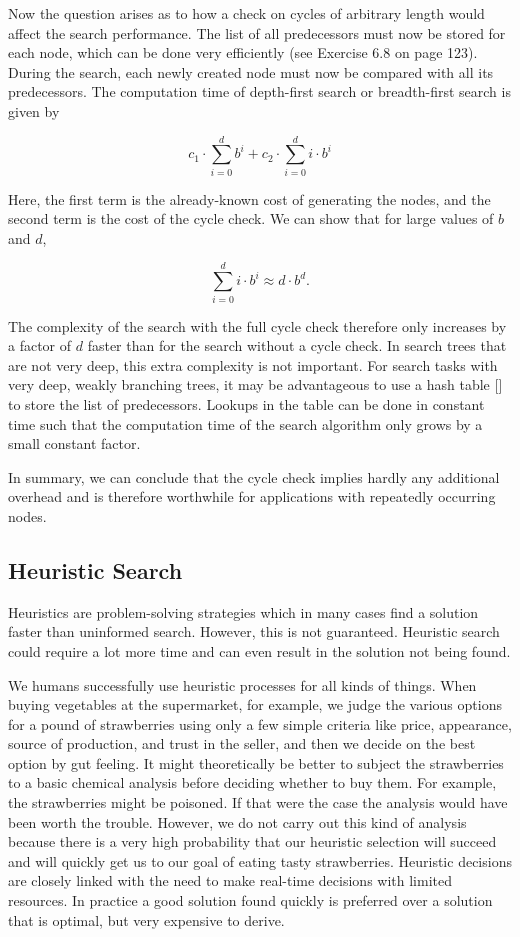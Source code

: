 \documentclass[10pt]{book}
\begin{document}
Now the question arises as to how a check on cycles of arbitrary length would affect the search performance. The list of all predecessors must now be stored for each node, which can be done very efficiently (see Exercise 6.8 on page 123). During the search, each newly created node must now be compared with all its predecessors. The computation time of depth-first search or breadth-first search is given by

$$
c_{1} \cdot \sum_{i=0}^{d} b^{i}+c_{2} \cdot \sum_{i=0}^{d} i \cdot b^{i}
$$

Here, the first term is the already-known cost of generating the nodes, and the second term is the cost of the cycle check. We can show that for large values of $b$ and $d$,

$$
\sum_{i=0}^{d} i \cdot b^{i} \approx d \cdot b^{d} .
$$

The complexity of the search with the full cycle check therefore only increases by a factor of $d$ faster than for the search without a cycle check. In search trees that are not very deep, this extra complexity is not important. For search tasks with very deep, weakly branching trees, it may be advantageous to use a hash table [\cite{clr90}] to store the list of predecessors. Lookups in the table can be done in constant time such that the computation time of the search algorithm only grows by a small constant factor.

In summary, we can conclude that the cycle check implies hardly any additional overhead and is therefore worthwhile for applications with repeatedly occurring nodes.

\subsection{Heuristic Search}
Heuristics are problem-solving strategies which in many cases find a solution faster than uninformed search. However, this is not guaranteed. Heuristic search could require a lot more time and can even result in the solution not being found.

We humans successfully use heuristic processes for all kinds of things. When buying vegetables at the supermarket, for example, we judge the various options for a pound of strawberries using only a few simple criteria like price, appearance, source of production, and trust in the seller, and then we decide on the best option by gut feeling. It might theoretically be better to subject the strawberries to a basic chemical analysis before deciding whether to buy them. For example, the strawberries might be poisoned. If that were the case the analysis would have been worth the trouble. However, we do not carry out this kind of analysis because there is a very high probability that our heuristic selection will succeed and will quickly get us to our goal of eating tasty strawberries.
Heuristic decisions are closely linked with the need to make real-time decisions with limited resources. In practice a good solution found quickly is preferred over a solution that is optimal, but very expensive to derive.
\end{document}
